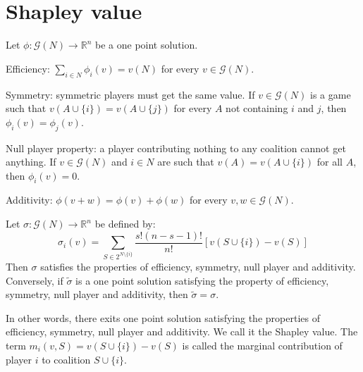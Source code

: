 \section{Shapley value}

Let $\phi:\mathcal{G}(N)\rightarrow\mathbb{R}^n$ be a one point solution. 
\begin{property}
    Efficiency: $\sum_{i\in N}\phi_i(v)=v(N)$ for every $v\in\mathcal{G}(N)$. 
\end{property}
\begin{property}
    Symmetry:  symmetric players must get the same value. 
    If $v\in\mathcal{G}(N)$ is a game such that $v(A\cup\{i\})=v(A\cup\{j\})$ for every $A$ not containing $i$ and $j$, then $\phi_i(v)=\phi_j(v)$. 
\end{property}
\begin{property}
    Null player property: a player contributing nothing to any coalition cannot get anything. 
    If $v\in\mathcal{G}(N)$ and $i\in N$ are such that $v(A)=v(A\cup\{i\})$ for all $A$, then $\phi_i(v)=0$. 
\end{property}
\begin{property}
    Additivity: $\phi(v+w)=\phi(v)+\phi(w)$ for every $v,w\in\mathcal{G}(N)$. 
\end{property}
\begin{theorem}
    Let $\sigma:\mathcal{G}(N)\rightarrow\mathbb{R}^n$ be defined by: 
    \[\sigma_i(v)=\sum_{S\in 2^{N\setminus\{i\}}}\dfrac{s!(n-s-1)!}{n!}\left[v(S\cup\{i\})-v(S)\right]\]
    Then $\sigma$ satisfies the properties of efficiency, symmetry, null player and additivity. 
    Conversely, if $\tilde{\sigma}$ is a one point solution satisfying the property of efficiency, symmetry, null player and additivity, then $\tilde{\sigma}=\sigma$. 
\end{theorem}
\noindent In other words, there exits one point solution satisfying the properties of efficiency, symmetry, null player and additivity.
We call it the Shapley value. 
The term $m_i(v,S)=v(S\cup\{i\})-v(S)$ is called the marginal contribution of player $i$ to coalition $S\cup\{i\}$. 
